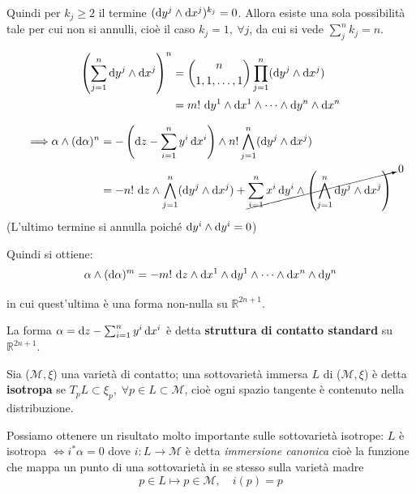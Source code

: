 Quindi per $k_j \ge 2$ il termine $(\odif{y^j} \wedge \odif{x^j})^{k_j} = 0$.
Allora esiste una sola possibilità tale per cui non si annulli, cioè il caso $k_j = 1, \: \forall j $, da cui si vede $\sum^n_j k_j = n$.

\begin{align*}
    \left(\sum_{j=1}^{n} \odif{y^j} \wedge \odif{x^j}\right)^n & = \binom{n}{1,1,\dots,1} \prod_{j=1}^{n} (\odif{y^j} \wedge \odif{x^j})               \\
                                                               & = m! \, \odif{y^1} \wedge \odif{x^1} \wedge \dots \wedge \odif{y^n} \wedge \odif{x^n}
\end{align*}

\begin{align*}
    \Longrightarrow \alpha \wedge (\odif{\alpha})^n & = -\left(\odif{z} - \sum_{i=1}^{n} y^i \odif{x^i}\right) \wedge n! \bigwedge_{j=1}^{n} (\odif{y^j} \wedge \odif{x^j})                                                                          \\
                                                    & = -n! \, \odif{z} \wedge \bigwedge_{j=1}^{n} (\odif{y^j} \wedge \odif{x^j}) + \cancelto{0}{\sum_{i=1}^{n} x^i \odif{y^i} \wedge \left(\bigwedge_{j=1}^{n} \odif{y^j} \wedge \odif{x^j}\right)}
\end{align*}
(L'ultimo termine si annulla poiché $\odif{y^i} \wedge \odif{y^i} = 0$)

Quindi si ottiene:
\begin{equation*}
    \alpha \wedge (\odif{\alpha})^m = -m! \, \odif{z} \wedge \odif{x^1} \wedge \odif{y^1} \wedge \dots \wedge \odif{x^n} \wedge \odif{y^n}
\end{equation*}

in cui quest'ultima è una forma non-nulla su $\mathbb{R}^{2n+1}$. \checkmark

La forma \( \alpha = \odif{z} - \sum_{i=1}^{n} y^i \odif{x^i} \) è detta \textbf{struttura di contatto standard} su $\mathbb{R}^{2n+1}$.

\begin{definition}
    Sia ($\mathcal{M}, \xi$) una varietà di contatto; una sottovarietà immersa $L$ di ($\mathcal{M}, \xi$) è detta \textbf{isotropa} se $T_p L \subset \xi_p, \; \forall p \in L \subset \mathcal{M}$, cioè ogni spazio tangente è contenuto nella distribuzione.
\end{definition}

Possiamo ottenere un risultato molto importante sulle sottovarietà isotrope: $L$ è isotropa \(\iff i^* \alpha = 0\) dove \(i : L \longrightarrow \mathcal{M}\) è detta \emph{immersione canonica} cioè la funzione che mappa un punto di una sottovarietà in se stesso sulla varietà madre
\[
    p \in L \mapsto p \in \mathcal{M}, \quad i(p) = p
\]

